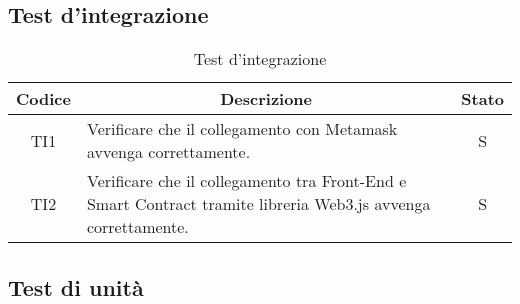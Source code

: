 \subsection{Test d'integrazione}\label{subsection:test_integrazione}
\begin{table}[H]
  \centering
  \renewcommand{\arraystretch}{1.8}
  \begin{tabular}{c|p{8cm}|c}
    \rowcolor[HTML]{125E28}
    \color[HTML]{FFFFFF}\textbf{Codice}
        & \multicolumn{1}{c}{\color[HTML]{FFFFFF}\textbf{Descrizione}}
        & \color[HTML]{FFFFFF}\textbf{Stato}                                                                                                  \\
    \hline
    TI1 & Verificare che il collegamento con Metamask\glo{} avvenga correttamente.                                                        & S \\
    TI2 & Verificare che il collegamento tra Front-End\glo{} e Smart Contract\glo{} tramite libreria Web3.js\glo{} avvenga correttamente. & S \\
  \end{tabular}
  \caption{Test d'integrazione}
\end{table}

\vspace{1cm}
\subsection{Test di unità}\label{subsection:test_unita}

